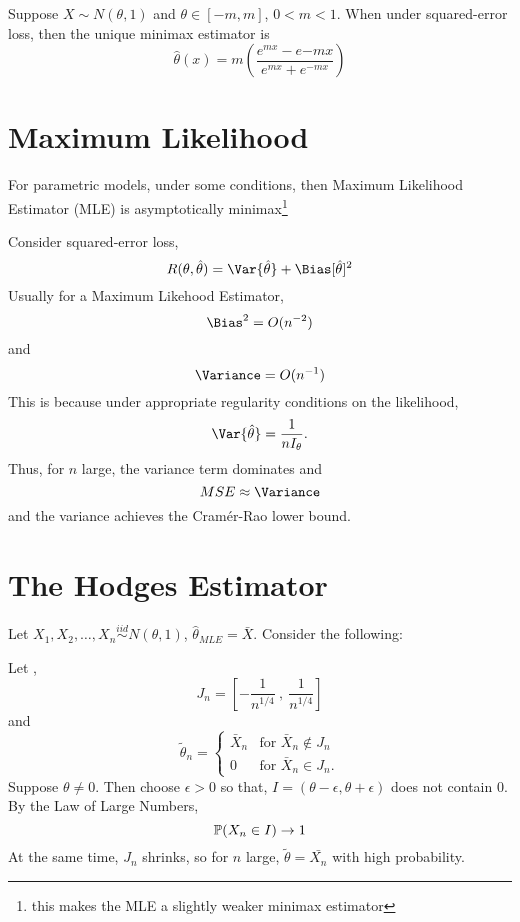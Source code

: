 \documentclass[10pt]{article}
\begin{document}
\begin{example}
  Suppose $X \sim N(\theta,1)$ and $\theta \in [-m, m]$, $0 < m <
  1$. When under squared-error loss, then the unique minimax estimator
  is 
  \begin{equation}
    \hat{\theta}(x) = m \left(\frac{e^{mx}-e{-mx}}{e^{mx} + e^{-mx}}\right)
  \end{equation}
\end{example}










\section{Maximum Likelihood}


For parametric models, under some conditions, then Maximum Likelihood
Estimator (MLE) is asymptotically minimax\footnote{this makes the MLE
  a slightly weaker minimax estimator}


Consider squared-error loss,
\begin{equation}
  R(\theta, \hat{\theta}) = \Var{\hat{\theta}}+\Bias[\hat{\theta}]^2
\end{equation}
Usually for a Maximum Likehood Estimator,
\begin{equation}
  \Bias^2 = O(n^{-2})
\end{equation}
and
\begin{equation}
  \Variance = O(n^{-1})
\end{equation}
This is because under appropriate regularity conditions on the
likelihood,
\[
\Var{\hat{\theta}}
= \frac{1}{nI_{\theta}} .
\]
Thus, for $n$ large, the variance term dominates and 
\[
MSE \approx \Variance
\]
and the variance achieves the Cram\'er-Rao lower bound.


\section{The Hodges Estimator}
Let $X_1, X_2,\dots,X_n \overset{iid}{\sim} N(\theta,1)$,
$\hat{\theta}_{MLE} = \bar{X}$. Consider the following: 

Let ,
\begin{equation}
  J_n = \left[ -\frac{1}{n^{1/4}}\ ,\ \frac{1}{n^{1/4}}\right]
\end{equation}
and
\begin{equation}
  \tilde{\theta}_n = 
  \begin{cases}
    \bar{X}_n & \textrm{for }\bar{X}_n \notin J_n\\
    0 &\textrm{for }\bar{X}_n \in J_n.
  \end{cases}
\end{equation}
Suppose $\theta \neq 0$. Then choose $\epsilon > 0$ so that,
  $I = (\theta - \epsilon, \theta + \epsilon)$  does not contain 0.
By the Law of Large Numbers,
\[
  \P(X_n \in I) \rightarrow 1
\]
At the same time, $J_n$ shrinks, so for $n$ large, $\tilde{\theta} =
\bar{X_n}$ with high probability. 
\end{document}
